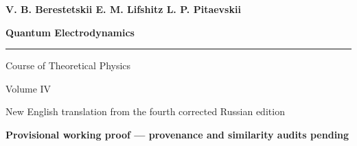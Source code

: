 \documentclass{openlandau-qed}
\begin{document}
\frontmatter
\begin{titlepage}
  \thispagestyle{empty}
  \sffamily
  \vspace*{12mm}
  {\Large\bfseries V. B. Berestetskii \enspace E. M. Lifshitz \enspace L. P. Pitaevskii\par}
  \vfill
  {\Huge\bfseries Quantum Electrodynamics\par}
  \vspace{8mm}
  \noindent\rule{\textwidth}{0.6pt}\par
  \vspace{4mm}
  {\large Course of Theoretical Physics\par}
  {\normalsize Volume IV\par}
  \vfill
  {\small New English translation from the fourth corrected Russian edition\par}
  \vspace{2mm}
  {\small\bfseries Provisional working proof --- provenance and similarity audits pending\par}
\end{titlepage}
\tableofcontents

\mainmatter















\backmatter
{}
\end{document}
